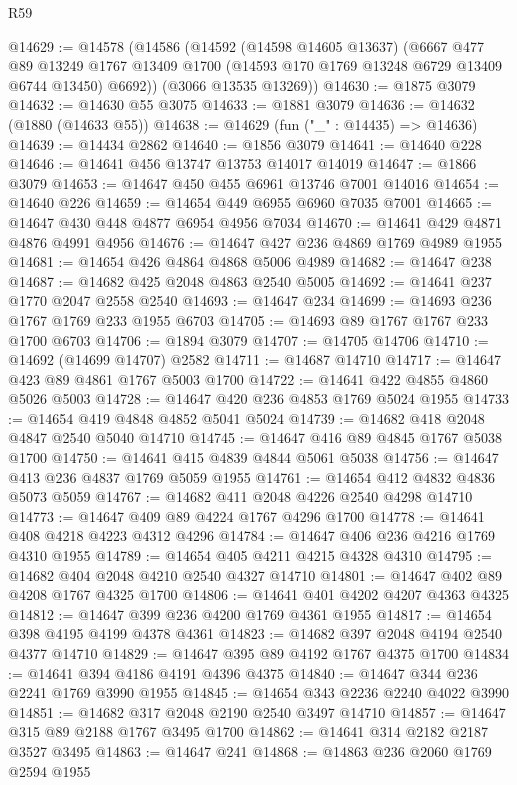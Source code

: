 \begin{lexlean}{R59}
\begin{coremodule}
@14629 := @14578
    (@14586
      (@14592
        (@14598 @14605 @13637)
        (@6667
          @477
          @89
          @13249
          @1767
          @13409
          @1700
          (@14593 @170 @1769 @13248 @6729 @13409 @6744 @13450)
          @6692))
      (@3066 @13535 @13269))
@14630 := @1875 @3079
@14632 := @14630 @55 @3075
@14633 := @1881 @3079
@14636 := @14632 (@1880 (@14633 @55))
@14638 := @14629 (fun ("_" : @14435) => @14636)
@14639 := @14434 @2862
@14640 := @1856 @3079
@14641 := @14640 @228
@14646 := @14641 @456 @13747 @13753 @14017 @14019
@14647 := @1866 @3079
@14653 := @14647 @450 @455 @6961 @13746 @7001 @14016
@14654 := @14640 @226
@14659 := @14654 @449 @6955 @6960 @7035 @7001
@14665 := @14647 @430 @448 @4877 @6954 @4956 @7034
@14670 := @14641 @429 @4871 @4876 @4991 @4956
@14676 := @14647 @427 @236 @4869 @1769 @4989 @1955
@14681 := @14654 @426 @4864 @4868 @5006 @4989
@14682 := @14647 @238
@14687 := @14682 @425 @2048 @4863 @2540 @5005
@14692 := @14641 @237 @1770 @2047 @2558 @2540
@14693 := @14647 @234
@14699 := @14693 @236 @1767 @1769 @233 @1955 @6703
@14705 := @14693 @89 @1767 @1767 @233 @1700 @6703
@14706 := @1894 @3079
@14707 := @14705 @14706
@14710 := @14692 (@14699 @14707) @2582
@14711 := @14687 @14710
@14717 := @14647 @423 @89 @4861 @1767 @5003 @1700
@14722 := @14641 @422 @4855 @4860 @5026 @5003
@14728 := @14647 @420 @236 @4853 @1769 @5024 @1955
@14733 := @14654 @419 @4848 @4852 @5041 @5024
@14739 := @14682 @418 @2048 @4847 @2540 @5040 @14710
@14745 := @14647 @416 @89 @4845 @1767 @5038 @1700
@14750 := @14641 @415 @4839 @4844 @5061 @5038
@14756 := @14647 @413 @236 @4837 @1769 @5059 @1955
@14761 := @14654 @412 @4832 @4836 @5073 @5059
@14767 := @14682 @411 @2048 @4226 @2540 @4298 @14710
@14773 := @14647 @409 @89 @4224 @1767 @4296 @1700
@14778 := @14641 @408 @4218 @4223 @4312 @4296
@14784 := @14647 @406 @236 @4216 @1769 @4310 @1955
@14789 := @14654 @405 @4211 @4215 @4328 @4310
@14795 := @14682 @404 @2048 @4210 @2540 @4327 @14710
@14801 := @14647 @402 @89 @4208 @1767 @4325 @1700
@14806 := @14641 @401 @4202 @4207 @4363 @4325
@14812 := @14647 @399 @236 @4200 @1769 @4361 @1955
@14817 := @14654 @398 @4195 @4199 @4378 @4361
@14823 := @14682 @397 @2048 @4194 @2540 @4377 @14710
@14829 := @14647 @395 @89 @4192 @1767 @4375 @1700
@14834 := @14641 @394 @4186 @4191 @4396 @4375
@14840 := @14647 @344 @236 @2241 @1769 @3990 @1955
@14845 := @14654 @343 @2236 @2240 @4022 @3990
@14851 := @14682 @317 @2048 @2190 @2540 @3497 @14710
@14857 := @14647 @315 @89 @2188 @1767 @3495 @1700
@14862 := @14641 @314 @2182 @2187 @3527 @3495
@14863 := @14647 @241
@14868 := @14863 @236 @2060 @1769 @2594 @1955

\end{coremodule}
\end{lexlean}
